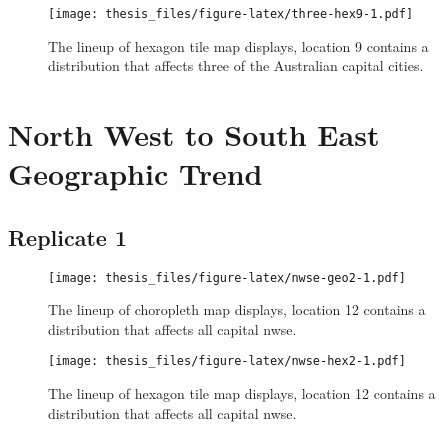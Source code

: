 \documentclass{monashthesis}
\begin{document}
\begin{figure}
\centering
\texttt{[image: thesis\_files/figure-latex/three-hex9-1.pdf]}
\caption{\label{fig:three-hex9}The lineup of hexagon tile map displays, location 9 contains a distribution that affects three of the Australian capital cities.}
\end{figure}

\hypertarget{north-west-to-south-east-geographic-trend}{%
\section{North West to South East Geographic Trend}\label{north-west-to-south-east-geographic-trend}}

\hypertarget{replicate-1-2}{%
\subsection{Replicate 1}\label{replicate-1-2}}

\begin{Shaded}
\begin{Highlighting}[]
\NormalTok{() }\OperatorTok{+}
\StringTok{  }\NormalTok{(}\NormalTok{(}\NormalTok{(}\NormalTok{)))}
\end{Highlighting}
\end{Shaded}

\begin{figure}
\centering
\texttt{[image: thesis\_files/figure-latex/nwse-geo2-1.pdf]}
\caption{\label{fig:nwse-geo2}The lineup of choropleth map displays, location 12 contains a distribution that affects all capital nwse.}
\end{figure}

\begin{Shaded}
\begin{Highlighting}[]
\NormalTok{() }\OperatorTok{+}
\StringTok{  }\NormalTok{(}\NormalTok{(}\NormalTok{(}\NormalTok{)))}
\end{Highlighting}
\end{Shaded}

\begin{figure}
\centering
\texttt{[image: thesis\_files/figure-latex/nwse-hex2-1.pdf]}
\caption{\label{fig:nwse-hex2}The lineup of hexagon tile map displays, location 12 contains a distribution that affects all capital nwse.}
\end{figure}
\end{document}

